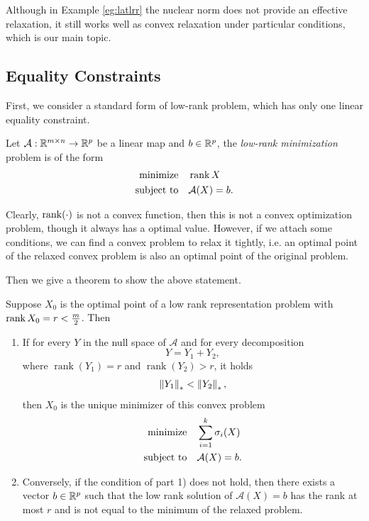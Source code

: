 \documentclass[11pt]{article}
\begin{document}
Although in Example \ref{eg:latlrr} the nuclear norm does not provide an effective relaxation, it still works well as convex relaxation under particular conditions, which is our main topic.

\subsection{Equality Constraints}

First, we consider a standard form of low-rank problem, which has only one linear equality constraint.
\begin{definition}\label{def:lowrank}
    Let \(\mathcal{A}:\mathbb R^{m\times n}\to \mathbb R^p\) be a linear map and \(b\in \mathbb R^p\), the \emph{low-rank minimization} problem is of the form 
    \[\begin{aligned}
        \textnormal{minimize}\quad & \operatorname{rank} X\\
        \textnormal{subject to}\quad & \mathcal A(X)=b.
    \end{aligned}\]
\end{definition}

Clearly, \(\operatorname{rank}(\cdot)\) is not a convex function, then this is not a convex optimization problem, though it always has a optimal value. However, if we attach some conditions, we can find a convex problem to relax it tightly, i.e. an optimal point of the relaxed convex problem is also an optimal point of the original problem.


Then we give a theorem to show the above statement.

\begin{theorem}\label{thm:relaxation}
    Suppose \(X_0\) is the optimal point of a low rank representation problem with \(\operatorname{rank} X_0=r<\frac{m}{2}\). Then 
    \begin{enumerate}[1)]
        \item If for every \(Y\) in the null space of \(\mathcal{A}\) and for every decomposition 
        \[Y=Y_1+Y_2,\]
        where \(\operatorname{rank}(Y_1)=r\) and \(\operatorname{rank}(Y_2)>r\), it holds 
        \[\left\|Y_1\right\|_*<\left\|Y_2\right\|_*,\]
        then \(X_0\) is the unique minimizer of this convex problem \[\begin{aligned}
            \textnormal{minimize}\quad & \sum_{i=1}^{k} \sigma_i(X)\\
            \textnormal{subject to}\quad & \mathcal A(X)=b.
        \end{aligned}\]
        \item Conversely, if the condition of part 1) does not hold, then there exists a vector \(b \in \mathbb R^p\) such that the low rank solution of \(\mathcal{A}(X)=b\) has the rank at most \(r\) and is not equal to the minimum of the relaxed problem. \cite{recht2008necessary}
    \end{enumerate} 
\end{theorem}
\end{document}
